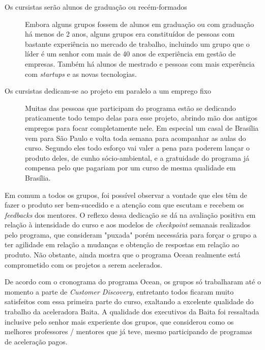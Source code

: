 \begin{description}
\item[Os cursistas serão alunos de graduação ou recém-formados] 

Embora alguns grupos fossem de alunos em graduação ou com graduação há menos de 2 anos, alguns grupos era constituídos de pessoas com bastante experiência no mercado de trabalho, incluindo um grupo que o líder é um senhor com mais de 40 anos de experiência em gestão de empresas. Também há alunos de mestrado e pessoas com mais experência com \textit{startups} e as novas tecnologias.

\item[Os cursistas dedicam-se ao projeto em paralelo a um emprego fixo] 

Muitas das pessoas que participam do programa estão se dedicando praticamente todo tempo delas para esse projeto, abrindo mão dos antigos empregos para focar completamente nele. Em especial um casal de Brasília vem para São Paulo e volta toda semana para acompanhar as aulas do curso. Segundo eles todo esforço vai valer a pena para poderem lançar o produto deles, de cunho sócio-ambiental, e a gratuidade do programa já compensa pelo que pagariam por um curso de mesma qualidade em Brasília.

\end{description}

Em comum a todos os grupos, foi possível observar a vontade que eles têm de fazer o produto ser bem-sucedido e a atenção com que escutam e recebem os \textit{feedbacks} dos mentores. O reflexo dessa dedicação se dá na avaliação positiva em relação à intensidade do curso e aos modelos de \textit{checkpoint} semanais realizados pelo programa, que consideram "puxada" porém necessária para forçar o grupo a ter agilidade em relação a mudanças e obtenção de respostas em relação ao produto. Não obstante, ainda mostra que o programa Ocean realmente está comprometido com os projetos a serem acelerados.

De acordo com o cronograma do programa Ocean, os grupos só trabalharam até o momento a parte de \textit{Customer Discovery}, entretanto todos ficaram muito satisfeitos com essa primeira parte do curso, exaltando a excelente qualidade do trabalho da aceleradora Baita. A qualidade dos executivos da Baita foi ressaltada inclusive pelo senhor mais experiente dos grupos, que considerou como os melhores professores / mentores que já teve, mesmo participando de programas de aceleração pagos.

